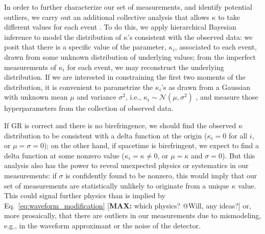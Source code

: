 \documentclass[aps,prd,twocolumn,superscriptaddress,preprintnumbers,floatfix,nofootinbib]{revtex4-2}
\newcommand*{\mi}[1]{\textsf{\color{magenta} [\textbf{MAX:} #1]}}
\begin{document}
In order to further characterize our set of measurements, and identify potential outliers, we carry out an additional collective analysis that allows $\kappa$ to take different values for each event \cite{Zimmerman:2019wzo,Isi:2022cii}.
To do this, we apply hierarchical Bayesian inference \cite{Loredo:2004nn} to model the distribution of $\kappa$'s consistent with the observed data:
we posit that there is a specific value of the parameter, $\kappa_i$, associated to each event, drawn from some unknown distribution of underlying values; from the imperfect measurements of $\kappa_i$ for each event, we may reconstruct the underlying distribution.
If we are interested in constraining the first two moments of the distribution, it is convenient to parametrize the $\kappa_i$'s as drawn from a Gaussian with unknown mean $\mu$ and variance $\sigma^2$, i.e., $\kappa_i \sim \mathcal{N}(\mu, \sigma^2)$ \cite{Isi:2019asy}, and measure those hyperparameters from the collection of observed data.

If \ac{GR} is correct and there is no birefringence, we should find the observed $\kappa$ distribution to be consistent with a delta function at the origin ($\kappa_i = 0$ for all $i$, or $\mu=\sigma=0$); on the other hand, if spacetime is birefringent, we expect to find a delta function at some nonzero value ($\kappa_i = \kappa \neq 0$, or $\mu = \kappa$ and $\sigma=0$).
But this analysis also has the power to reveal unexpected physics or systematics in our measurements: if $\sigma$ is confidently found to be nonzero, this would imply that our set of measurements are statistically unlikely to originate from a unique $\kappa$ value.
This could signal further physics than is implied by Eq.~\eqref{eq:waveform_modification} \mi{which physics? @Will, any ideas?} or, more prosaically, that there are outliers in our measurements due to mismodeling, e.g., in the waveform approximant or the noise of the detector.
\end{document}
